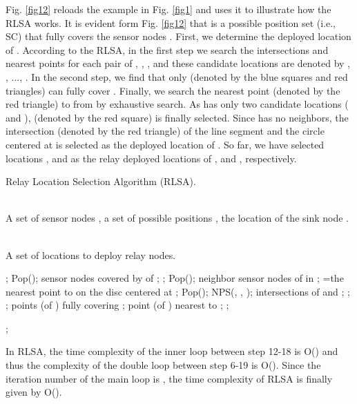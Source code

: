 \documentclass[journal]{IEEEtran}
\begin{document}
Fig. \ref{fig12} reloads the example in Fig. \ref{fig1} and uses it to illustrate how the RLSA works. It is evident form Fig. \ref{fig12} that  is a possible position set (i.e., SC) that fully covers the sensor nodes . First, we determine the deployed location of . According to the RLSA, in the first step we search the intersections and nearest points for each pair of , , , and these candidate locations are denoted by , , ..., . In the second step, we find that only  (denoted by the blue squares and red triangles) can fully cover . Finally, we search the nearest point  (denoted by the red triangle) to  from  by exhaustive search. As  has only two candidate locations ( and ),  (denoted by the red square) is finally selected. Since  has no neighbors, the intersection  (denoted by the red triangle) of the line segment  and the circle centered at  is selected as the deployed location of . So far, we have selected locations ,  and  as the relay deployed locations of ,  and , respectively.




\begin{algorithm}[htb]         \caption{Relay Location Selection Algorithm (RLSA).}             
\label{RLSA}                  
\begin{algorithmic}[1]                
\REQUIRE ~~\\                          
   A set of sensor nodes , a set of possible positions , the location of the sink node .

\ENSURE ~~\\                           
   A set of locations  to deploy relay nodes.

\STATE ;
\WHILE{()}
    \STATE Pop();
    \STATE sensor nodes covered by  of ;
    \STATE ;
    \WHILE{()}
        \STATE Pop();
        \STATE neighbor sensor nodes of  in ;
        \IF{()}
            \STATE =the nearest point to  on the disc centered at ;
        \ENDIF
        \WHILE{()}
            \STATE Pop();
            \STATE NPS(, , );
            \STATE intersections of  and ;
            \STATE ;
            \STATE ;
        \ENDWHILE
    \ENDWHILE
    \STATE points (of ) fully covering ;
    \STATE point (of ) nearest to ;
    \STATE ;
\ENDWHILE


\RETURN ;                
\end{algorithmic}

\end{algorithm}

In RLSA, the time complexity of the inner loop between step 12-18 is O() and thus the complexity of the double loop between step 6-19 is O(). Since the iteration number of the main loop is , the time complexity of RLSA is finally given by O().
\end{document}
